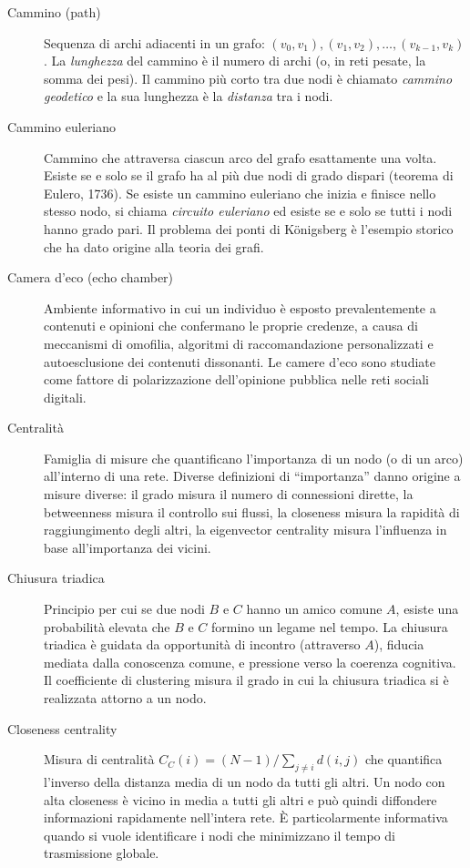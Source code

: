 \documentclass[12pt,a4paper]{article}
\begin{document}
\begin{description}
  \item[Cammino (path)] Sequenza di archi adiacenti in un grafo: $(v_0,v_1),(v_1,v_2),
  \ldots,(v_{k-1},v_k)$. La \textit{lunghezza} del cammino è il numero di archi (o, in
  reti pesate, la somma dei pesi). Il cammino più corto tra due nodi è chiamato
  \textit{cammino geodetico} e la sua lunghezza è la \textit{distanza} tra i nodi.

  \item[Cammino euleriano] Cammino che attraversa ciascun arco del grafo esattamente una
  volta. Esiste se e solo se il grafo ha al più due nodi di grado dispari (teorema di
  Eulero, 1736). Se esiste un cammino euleriano che inizia e finisce nello stesso nodo,
  si chiama \textit{circuito euleriano} ed esiste se e solo se tutti i nodi hanno grado
  pari. Il problema dei ponti di Königsberg è l'esempio storico che ha dato origine alla
  teoria dei grafi.

  \item[Camera d'eco (echo chamber)] Ambiente informativo in cui un individuo è esposto
  prevalentemente a contenuti e opinioni che confermano le proprie credenze, a causa di
  meccanismi di omofilia, algoritmi di raccomandazione personalizzati e autoesclusione
  dei contenuti dissonanti. Le camere d'eco sono studiate come fattore di polarizzazione
  dell'opinione pubblica nelle reti sociali digitali.

  \item[Centralità] Famiglia di misure che quantificano l'importanza di un nodo (o di un
  arco) all'interno di una rete. Diverse definizioni di ``importanza'' danno origine a
  misure diverse: il grado misura il numero di connessioni dirette, la betweenness misura
  il controllo sui flussi, la closeness misura la rapidità di raggiungimento degli altri,
  la eigenvector centrality misura l'influenza in base all'importanza dei vicini.

  \item[Chiusura triadica] Principio per cui se due nodi $B$ e $C$ hanno un amico comune
  $A$, esiste una probabilità elevata che $B$ e $C$ formino un legame nel tempo. La
  chiusura triadica è guidata da opportunità di incontro (attraverso $A$), fiducia
  mediata dalla conoscenza comune, e pressione verso la coerenza cognitiva. Il
  coefficiente di clustering misura il grado in cui la chiusura triadica si è realizzata
  attorno a un nodo.

  \item[Closeness centrality] Misura di centralità $C_C(i) = (N-1)/\sum_{j\neq i}d(i,j)$
  che quantifica l'inverso della distanza media di un nodo da tutti gli altri. Un nodo
  con alta closeness è vicino in media a tutti gli altri e può quindi diffondere
  informazioni rapidamente nell'intera rete. È particolarmente informativa quando si
  vuole identificare i nodi che minimizzano il tempo di trasmissione globale.


\end{description}
\end{document}
